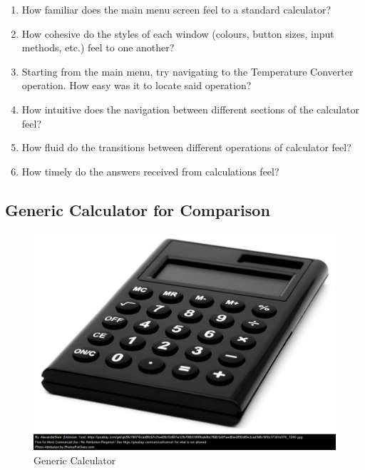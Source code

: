 \documentclass[12pt, titlepage]{article}
\begin{document}
\begin{enumerate}

\item How familiar does the main menu screen feel to a standard calculator?
    
\item How cohesive do the styles of each window (colours, button sizes, input methods, etc.) feel to one another?

\item Starting from the main menu, try navigating to the Temperature Converter operation. How easy was it to locate said operation?

\item How intuitive does the navigation between different sections of the calculator feel?

\item How fluid do the transitions between different operations of calculator feel?

\item How timely do the answers received from calculations feel?

\end{enumerate}


\subsection{Generic Calculator for Comparison}

\begin{figure}[H]
    \centering
    \includegraphics[scale=0.4]{Calc.png}
    \caption{Generic Calculator}
    \label{calc}
\end{figure}
\end{document}

